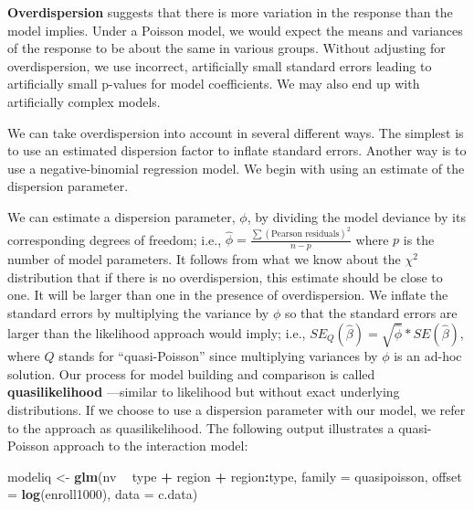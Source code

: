 \documentclass[
]{krantz}
\newenvironment{Shaded}{\begin{snugshade}}{\end{snugshade}}
\newcommand{\DataTypeTok}[1]{\textcolor[rgb]{0.27,0.27,0.27}{#1}}
\newcommand{\KeywordTok}[1]{\textcolor[rgb]{0.27,0.27,0.27}{\textbf{#1}}}
\newcommand{\NormalTok}[1]{#1}
\newcommand{\OperatorTok}[1]{\textcolor[rgb]{0.43,0.43,0.43}{\textbf{#1}}}
\newcommand{\StringTok}[1]{\textcolor[rgb]{0.5,0.5,0.5}{#1}}
\begin{document}
\textbf{Overdispersion}  suggests that there is more variation in the response than the model implies. Under a Poisson model, we would expect the means and variances of the response to be about the same in various groups. Without adjusting for overdispersion, we use incorrect, artificially small standard errors leading to artificially small p-values for model coefficients. We may also end up with artificially complex models.

We can take overdispersion into account in several different ways. The simplest is to use an estimated dispersion factor to inflate standard errors. Another way is to use a negative-binomial regression model. We begin with using an estimate of the dispersion parameter.

We can estimate a dispersion parameter, \(\phi\), by dividing the model deviance by its corresponding degrees of freedom; i.e., \(\hat\phi=\frac{\sum(\textrm{Pearson residuals})^2}{n-p}\) where \(p\) is the number of model parameters. It follows from what we know about the \(\chi^2\) distribution that if there is no overdispersion, this estimate should be close to one. It will be larger than one in the presence of overdispersion. We inflate the standard errors by multiplying the variance by \(\phi\) so that the standard errors are larger than the likelihood approach would imply; i.e., \(SE_Q(\hat\beta)=\sqrt{\hat\phi}*SE(\hat\beta)\), where \(Q\) stands for ``quasi-Poisson''  since multiplying variances by \(\phi\) is an ad-hoc solution. Our process for model building and comparison is called \textbf{quasilikelihood} ---similar to likelihood but without exact underlying distributions. If we choose to use a dispersion parameter with our model, we refer to the approach as quasilikelihood. The following output illustrates a quasi-Poisson approach to the interaction model:

\begin{Shaded}
\begin{Highlighting}[]
\NormalTok{modeliq <-}\StringTok{ }\KeywordTok{glm}\NormalTok{(nv }\OperatorTok{~}\StringTok{ }\NormalTok{type }\OperatorTok{+}\StringTok{ }\NormalTok{region }\OperatorTok{+}\StringTok{ }\NormalTok{region}\OperatorTok{:}\NormalTok{type, }
               \DataTypeTok{family =}\NormalTok{ quasipoisson,}
               \DataTypeTok{offset =} \KeywordTok{log}\NormalTok{(enroll1000), }\DataTypeTok{data =}\NormalTok{ c.data)}
\end{Highlighting}
\end{Shaded}
\end{document}
